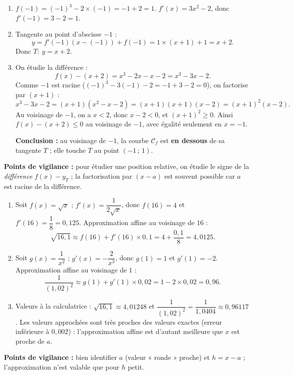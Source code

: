 \documentclass[11pt]{article}
\begin{document}
\begin{corrige}
\begin{enumerate}
\item $f(-1)=(-1)^3-2\times(-1)=-1+2=1$. $f'(x)=3x^2-2$, donc $f'(-1)=3-2=1$.
\item Tangente au point d'abscisse $-1$ :
\[ y=f'(-1)(x-(-1))+f(-1)=1\times(x+1)+1=x+2. \]
Donc $T:\ y=x+2$.
\item On étudie la différence :
\[ f(x)-(x+2)=x^3-2x-x-2=x^3-3x-2. \]
Comme $-1$ est racine ($(-1)^3-3(-1)-2=-1+3-2=0$), on factorise par $(x+1)$ :
\[ x^3-3x-2=(x+1)(x^2-x-2)=(x+1)(x+1)(x-2)=(x+1)^2(x-2). \]
Au voisinage de $-1$, on a $x<2$, donc $x-2<0$, et $(x+1)^2\geq 0$. Ainsi $f(x)-(x+2)\leq 0$ au voisinage de $-1$, avec égalité seulement en $x=-1$.

\textbf{Conclusion :} au voisinage de $-1$, la courbe $\mathcal{C}_f$ est \textbf{en dessous} de sa tangente $T$ ; elle touche $T$ au point $(-1\,;\,1)$.
\end{enumerate}
\textbf{Points de vigilance :} pour étudier une position relative, on étudie le signe de la \emph{différence} $f(x)-y_T$ ; la factorisation par $(x-a)$ est souvent possible car $a$ est racine de la différence.
\end{corrige}

\begin{corrige}
\begin{enumerate}
\item Soit $f(x)=\sqrt{x}$ ; $f'(x)=\dfrac{1}{2\sqrt{x}}$, donc $f(16)=4$ et $f'(16)=\dfrac{1}{8}=0{,}125$. Approximation affine au voisinage de $16$ :
\[ \sqrt{16{,}1}\approx f(16)+f'(16)\times 0{,}1=4+\dfrac{0{,}1}{8}=4{,}0125. \]
\item Soit $g(x)=\dfrac{1}{x^2}$ ; $g'(x)=-\dfrac{2}{x^3}$, donc $g(1)=1$ et $g'(1)=-2$. Approximation affine au voisinage de $1$ :
\[ \dfrac{1}{(1{,}02)^2}\approx g(1)+g'(1)\times 0{,}02=1-2\times 0{,}02=0{,}96. \]
\item Valeurs à la calculatrice : $\sqrt{16{,}1}\approx 4{,}01248$ et $\dfrac{1}{(1{,}02)^2}=\dfrac{1}{1{,}0404}\approx 0{,}96117$. Les valeurs approchées sont très proches des valeurs exactes (erreur inf\'erieure \`a $0{,}002$) : l'approximation affine est d'autant meilleure que $x$ est proche de $a$.
\end{enumerate}
\textbf{Points de vigilance :} bien identifier $a$ (valeur « ronde » proche) et $h=x-a$ ; l'approximation n'est valable que pour $h$ petit.
\end{corrige}
\end{document}

